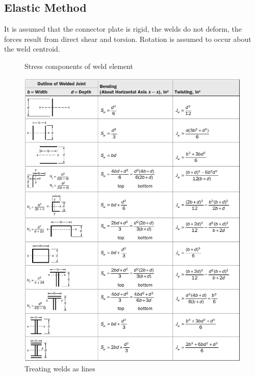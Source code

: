 \subsection{Elastic Method}
It is assumed that the connector plate is rigid, the welds do not deform, the forces result from direct shear and torsion. Rotation is assumed to occur about the weld centroid.
\begin{figure}[H]\centering
\caption{Stress components of weld element}
\end{figure}
\begin{figure}[ht!]
\centering
\includegraphics[width=.9\textwidth]{PIC/CH08/SW}
\caption{Treating welds as lines \citep{Roark2012}}\label{fig:weld_line}
\end{figure}
